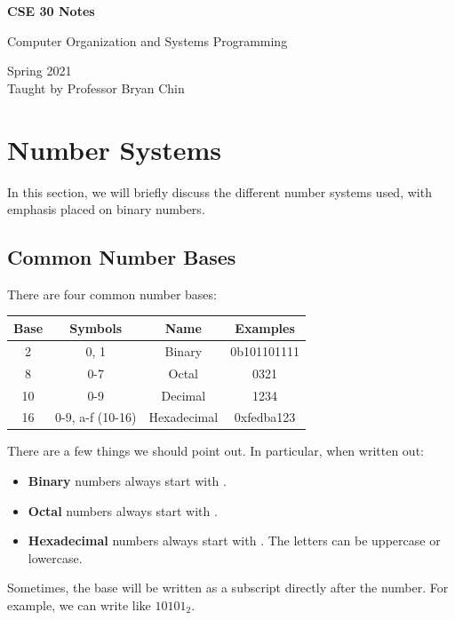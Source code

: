 \documentclass[letterpaper]{article}
\begin{document}
\begin{titlepage}
    \begin{center}
        \vspace*{1cm}
            
        \Huge
        \textbf{CSE 30 Notes}
            
        \vspace{0.5cm}
        \LARGE
        Computer Organization and Systems Programming
            
        \vspace{1.5cm}
            
        \vfill
            
        Spring 2021\\
        Taught by Professor Bryan Chin
    \end{center}
\end{titlepage}


\newpage 

\begingroup
    \renewcommand\contentsname{Table of Contents}
    \tableofcontents
\endgroup

\newpage
{}

\section{Number Systems}
In this section, we will briefly discuss the different number systems used, with emphasis placed on binary numbers.

\subsection{Common Number Bases}
There are four common number bases:
\begin{center}
    \begin{tabular}{c|c|c|c}
        \textbf{Base} & \textbf{Symbols} & \textbf{Name} & \textbf{Examples} \\ 
        \hline 
        2 & 0, 1 & Binary & 0b101101111 \\ 
        8 & 0-7 & Octal & 0321 \\ 
        10 & 0-9 & Decimal & 1234 \\ 
        16 & 0-9, a-f (10-16) & Hexadecimal & 0xfedba123
    \end{tabular}
\end{center}

There are a few things we should point out. In particular, when written out:
\begin{itemize}
    \item \textbf{Binary} numbers always start with . 
    \item \textbf{Octal} numbers always start with .
    \item \textbf{Hexadecimal} numbers always start with . The letters can be uppercase or lowercase.
\end{itemize}
Sometimes, the base will be written as a subscript directly after the number. For example, we can write  like $10101_{2}$. 
\end{document}
